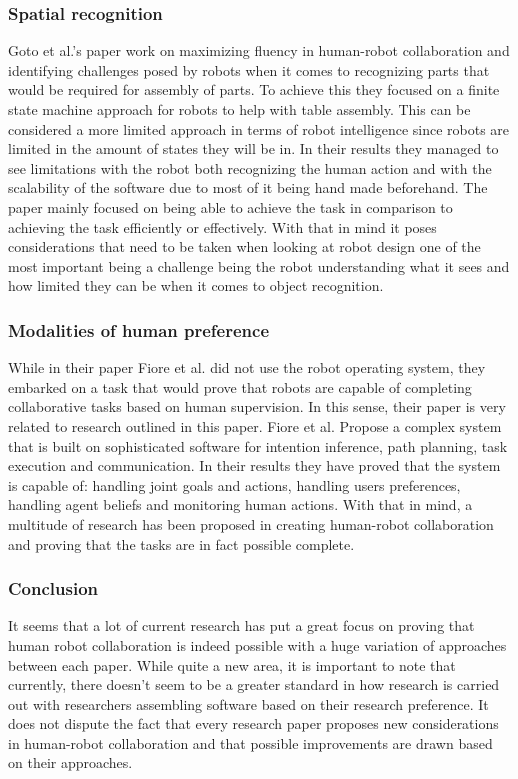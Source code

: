       \subsubsection{Spatial recognition}
        Goto et al.'s\cite{Hiraki} paper work on maximizing fluency in human-robot collaboration and identifying challenges posed by robots when it comes to recognizing parts that would be required for assembly of parts. To achieve this they focused on a finite state machine approach for robots to help with table assembly. This can be considered a more limited approach in terms of robot intelligence since robots are limited in the amount of states they will be in. In their results they managed to see limitations with the robot both recognizing the human action and with the scalability of the software due to most of it being hand made beforehand. The paper mainly focused on being able to achieve the task in comparison to achieving the task efficiently or effectively. With that in mind it poses considerations that need to be taken when looking at robot design one of the most important being a challenge being the robot understanding what it sees and how limited they can be when it comes to object recognition.

      \subsubsection{Modalities of human preference}
        While in their paper Fiore et al.\cite{Fiore} did not use the robot operating system, they embarked on a task that would prove that robots are capable of completing collaborative tasks based on human supervision. In this sense, their paper is very related to research outlined in this paper. Fiore et al. Propose a complex system that is built on sophisticated software for intention inference, path planning, task execution and communication. In their results they have proved that the system is capable of: handling joint goals and actions, handling users preferences, handling agent beliefs and monitoring human actions. With that in mind, a multitude of research has been proposed in creating human-robot collaboration and proving that the tasks are in fact possible complete.

      \subsubsection{Conclusion}
        It seems that a lot of current research has put a great focus on proving that human robot collaboration is indeed possible with a huge variation of approaches between each paper. While quite a new area, it is important to note that currently, there doesn't seem to be a greater standard in how research is carried out with researchers assembling software based on their research preference. It does not dispute the fact that every research paper proposes new considerations in human-robot collaboration and that possible improvements are drawn based on their approaches.

